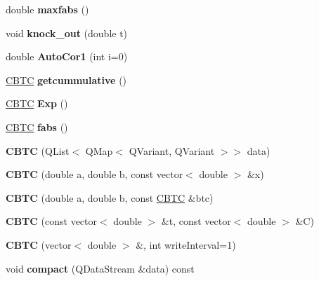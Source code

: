 \begin{DoxyCompactItemize}
\item 
\mbox{\label{class_c_b_t_c_a494c1244a6dbab13cac1deaf9ffdbfa2}} 
double {\bfseries maxfabs} ()
\item 
\mbox{\label{class_c_b_t_c_a16f349ef2935a2d7305704505bf07208}} 
void {\bfseries knock\+\_\+out} (double t)
\item 
\mbox{\label{class_c_b_t_c_a18bfd9ad50fd40f501e8dde800ccc23e}} 
double {\bfseries Auto\+Cor1} (int i=0)
\item 
\mbox{\label{class_c_b_t_c_a31985bb720063788a2a39a3156f18768}} 
\hyperlink{class_c_b_t_c}{C\+B\+TC} {\bfseries getcummulative} ()
\item 
\mbox{\label{class_c_b_t_c_a6713c791f7628318f94447f8c559dc6f}} 
\hyperlink{class_c_b_t_c}{C\+B\+TC} {\bfseries Exp} ()
\item 
\mbox{\label{class_c_b_t_c_a0948a9382051971932af9c7c9046b80f}} 
\hyperlink{class_c_b_t_c}{C\+B\+TC} {\bfseries fabs} ()
\item 
\mbox{\label{class_c_b_t_c_a8da890f12f46ab7d2f59ecf0f2392732}} 
{\bfseries C\+B\+TC} (Q\+List$<$ Q\+Map$<$ Q\+Variant, Q\+Variant $>$$>$ data)
\item 
\mbox{\label{class_c_b_t_c_a072cc429d80c1b49b65fff279d93d684}} 
{\bfseries C\+B\+TC} (double a, double b, const vector$<$ double $>$ \&x)
\item 
\mbox{\label{class_c_b_t_c_ace705d79b49e2e88509f856642751b2f}} 
{\bfseries C\+B\+TC} (double a, double b, const \hyperlink{class_c_b_t_c}{C\+B\+TC} \&btc)
\item 
\mbox{\label{class_c_b_t_c_a4b68fed0de7030552dcdea36cd2b0e90}} 
{\bfseries C\+B\+TC} (const vector$<$ double $>$ \&t, const vector$<$ double $>$ \&C)
\item 
\mbox{\label{class_c_b_t_c_a7f6dd90b4b77f2cce2b3386b49284ec3}} 
{\bfseries C\+B\+TC} (vector$<$ double $>$ \&, int write\+Interval=1)
\item 
\mbox{\label{class_c_b_t_c_a03e1f55025aa3212e1b43219e5e21702}} 
void {\bfseries compact} (Q\+Data\+Stream \&data) const
\end{DoxyCompactItemize}
